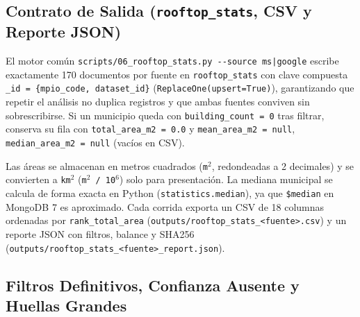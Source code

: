 \documentclass[11pt, a4paper]{article}
\begin{document}
\subsection{Contrato de Salida (\texttt{rooftop\_stats}, CSV y Reporte JSON)}

El motor común \texttt{scripts/06\_rooftop\_stats.py -{}-source ms|google} escribe exactamente 170 documentos por fuente en \texttt{rooftop\_stats} con clave compuesta \texttt{\_id = \{mpio\_code, dataset\_id\}} (\texttt{ReplaceOne(upsert=True)}), garantizando que repetir el análisis no duplica registros y que ambas fuentes conviven sin sobrescribirse. Si un municipio queda con \texttt{building\_count = 0} tras filtrar, conserva su fila con \texttt{total\_area\_m2 = 0.0} y \texttt{mean\_area\_m2 = null}, \texttt{median\_area\_m2 = null} (vacíos en CSV).

Las áreas se almacenan en metros cuadrados (\texttt{m$^2$}, redondeadas a 2 decimales) y se convierten a \texttt{km$^2$} (\texttt{m$^2$ / 10$^6$}) solo para presentación. La mediana municipal se calcula de forma exacta en Python (\texttt{statistics.median}), ya que \texttt{\$median} en MongoDB 7 es aproximado. Cada corrida exporta un CSV de 18 columnas ordenadas por \texttt{rank\_total\_area} (\texttt{outputs/rooftop\_stats\_<fuente>.csv}) y un reporte JSON con filtros, balance y SHA256 (\texttt{outputs/rooftop\_stats\_<fuente>\_report.json}).

\subsection{Filtros Definitivos, Confianza Ausente y Huellas Grandes}
\end{document}
